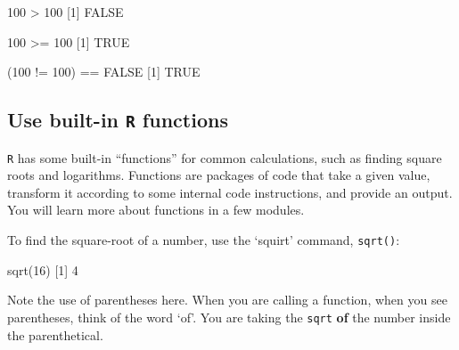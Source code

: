 \documentclass[
]{book}
\newenvironment{Shaded}{\begin{snugshade}}{\end{snugshade}}
\newcommand{\ConstantTok}[1]{\textcolor[rgb]{0.00,0.00,0.00}{#1}}
\newcommand{\DecValTok}[1]{\textcolor[rgb]{0.00,0.00,0.81}{#1}}
\newcommand{\FunctionTok}[1]{\textcolor[rgb]{0.00,0.00,0.00}{#1}}
\newcommand{\NormalTok}[1]{#1}
\newcommand{\SpecialCharTok}[1]{\textcolor[rgb]{0.00,0.00,0.00}{#1}}
\begin{document}
\begin{Shaded}
\begin{Highlighting}[]
\DecValTok{100} \SpecialCharTok{\textgreater{}} \DecValTok{100}
\NormalTok{[}\DecValTok{1}\NormalTok{] }\ConstantTok{FALSE}
\end{Highlighting}
\end{Shaded}

\begin{Shaded}
\begin{Highlighting}[]
\DecValTok{100} \SpecialCharTok{\textgreater{}=} \DecValTok{100}
\NormalTok{[}\DecValTok{1}\NormalTok{] }\ConstantTok{TRUE}
\end{Highlighting}
\end{Shaded}

\begin{Shaded}
\begin{Highlighting}[]
\NormalTok{(}\DecValTok{100} \SpecialCharTok{!=} \DecValTok{100}\NormalTok{) }\SpecialCharTok{==} \ConstantTok{FALSE}
\NormalTok{[}\DecValTok{1}\NormalTok{] }\ConstantTok{TRUE}
\end{Highlighting}
\end{Shaded}

\hypertarget{use-built-in-r-functions}{%
\subsection*{\texorpdfstring{Use built-in \texttt{R} functions}{Use built-in R functions}}\label{use-built-in-r-functions}}

\texttt{R} has some built-in ``functions'' for common calculations, such as finding square roots and logarithms. Functions are packages of code that take a given value, transform it according to some internal code instructions, and provide an output. You will learn more about functions in a few modules.

To find the square-root of a number, use the `squirt' command, \texttt{sqrt()}:

\begin{Shaded}
\begin{Highlighting}[]
\FunctionTok{sqrt}\NormalTok{(}\DecValTok{16}\NormalTok{)}
\NormalTok{[}\DecValTok{1}\NormalTok{] }\DecValTok{4}
\end{Highlighting}
\end{Shaded}

Note the use of parentheses here. When you are calling a function, when you see parentheses, think of the word `of'. You are taking the \texttt{sqrt} \textbf{of} the number inside the parenthetical.
\end{document}
